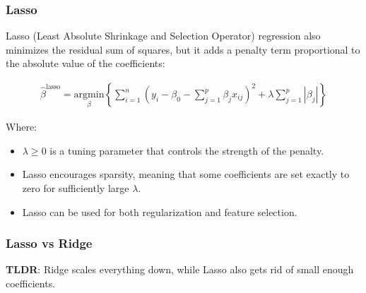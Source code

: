 \documentclass{article}
\begin{document}
\subsubsection{Lasso}

Lasso (Least Absolute Shrinkage and Selection Operator) regression also minimizes the residual sum of squares, but it adds a penalty term proportional to the absolute value of the coefficients:

\begin{align*}
    \hat{\beta}^\text{lasso} = \underset{\beta}{\mathrm{argmin}} \left\{ \sum_{i=1}^{n} (y_i - \beta_0 - \sum_{j=1}^{p} \beta_j x_{ij})^2 + \lambda \sum_{j=1}^{p} |\beta_j| \right\}
\end{align*}

Where:
\begin{itemize}
    \item $\lambda \geq 0$ is a tuning parameter that controls the strength of the penalty.
    \item Lasso encourages sparsity, meaning that some coefficients are set exactly to zero for sufficiently large $\lambda$.
    \item Lasso can be used for both regularization and feature selection.
\end{itemize}

\subsubsection{Lasso vs Ridge}

\textbf{TLDR}: Ridge scales everything down, while Lasso also gets rid of small enough coefficients.
\end{document}
